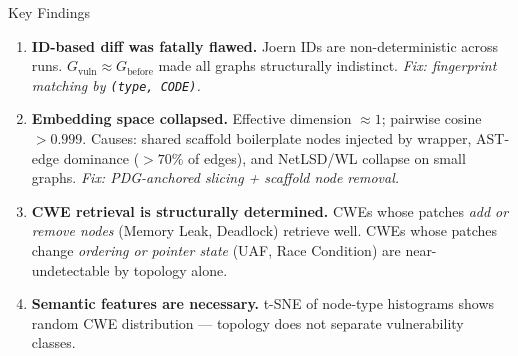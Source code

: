 \documentclass[aspectratio=169,10pt]{beamer}
\begin{document}
\begin{frame}{Key Findings}
\begin{enumerate}
  \item[\faIcon{bug}\;] \textbf{ID-based diff was fatally flawed.}
    Joern IDs are non-deterministic across runs.
    $G_{\text{vuln}} \approx G_{\text{before}}$ made all graphs
    structurally indistinct.
    \textit{Fix: fingerprint matching by \texttt{(type, CODE)}.}

  \vspace{0.5em}
  \item[\faIcon{compress-arrows-alt}\;]
    \textbf{Embedding space collapsed.}
    Effective dimension $\approx 1$; pairwise cosine $> 0.999$.
    Causes: shared scaffold boilerplate nodes injected by wrapper,
    AST-edge dominance ($> 70\%$ of edges), and NetLSD/WL collapse
    on small graphs.
    \textit{Fix: PDG-anchored slicing + scaffold node removal.}

  \vspace{0.5em}
  \item[\faIcon{chart-bar}\;] \textbf{CWE retrieval is structurally determined.}
    CWEs whose patches \emph{add or remove nodes}
    (Memory Leak, Deadlock) retrieve well.
    CWEs whose patches change \emph{ordering or pointer state}
    (UAF, Race Condition) are near-undetectable by topology alone.

  \vspace{0.5em}
  \item[\faIcon{code}\;] \textbf{Semantic features are necessary.}
    t-SNE of node-type histograms shows random CWE distribution —
    topology does not separate vulnerability classes.
\end{enumerate}
\end{frame}


\end{document}
